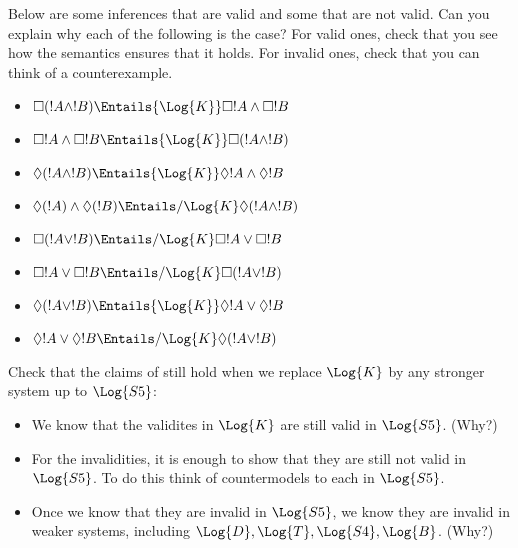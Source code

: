 \documentclass[../../../include/open-logic-section]{subfiles}
\begin{document}
\begin{prob}
    Below are some inferences that are valid and some that are not 
    valid. Can you explain why each of the following is the case? 
    For valid ones, check that you see how the semantics ensures that it holds. 
    For invalid ones, check that you can think of a counterexample.
    \begin{itemize}
        \item $\Box(!A\land!B) \Entails{\Log{K}} \Box !A \land \Box !B$
        \item $\Box !A \land \Box !B \Entails{\Log{K}} \Box(!A \land !B)$
        \item $\Diamond(!A\land!B) \Entails{\Log{K}} \Diamond !A \land \Diamond !B$
        \item $\Diamond(!A)\land\Diamond(!B) \Entails/{\Log{K}} \Diamond (!A \land !B)$
        \item $\Box(!A\lor!B) \Entails/{\Log{K}} \Box !A \lor \Box !B$
        \item $\Box !A \lor \Box !B \Entails/{\Log{K}} \Box (!A \lor !B)$
        \item $\Diamond(!A\lor!B) \Entails{\Log{K}} \Diamond !A \lor \Diamond !B$
        \item $\Diamond !A \lor \Diamond !B \Entails/{\Log{K} \Diamond(!A\lor!B)}$ 
    \end{itemize}
\end{prob}

\begin{prob}
    Check that the claims of  still hold when we replace $\Log{K}$
    by any stronger system up to $\Log{S5}$:
    \begin{itemize}
        \item We know that the validites in $\Log{K}$ are still valid 
        in $\Log{S5}$. (Why?)
        \item For the invalidities, it is enough to show that they are
        still not valid in $\Log{S5}$. To do this think of countermodels
        to each in $\Log{S5}$.
        \item Once we know that they are invalid in $\Log{S5}$, we know
        they are invalid in weaker systems, including
         $\Log{D},\Log{T},\Log{S4},\Log{B}$. (Why?)
    \end{itemize}

\end{prob}
\end{document}
